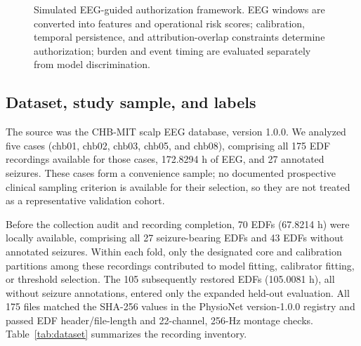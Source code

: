 \documentclass[11pt,a4paper]{article}
\begin{document}
\begin{figure}[H]
\centering
{}
\caption{Simulated EEG-guided authorization framework. EEG windows are converted into features and operational risk scores; calibration, temporal persistence, and attribution-overlap constraints determine authorization; burden and event timing are evaluated separately from model discrimination.}
\label{fig:pipeline}
\end{figure}
\FloatBarrier

\subsection{Dataset, study sample, and labels}
\label{sec:collection}
The source was the CHB-MIT scalp EEG database, version 1.0.0\citep{guttag2010chbmit}. We analyzed five cases (chb01, chb02, chb03, chb05, and chb08), comprising all 175 EDF recordings available for those cases, 172.8294 h of EEG, and 27 annotated seizures. These cases form a convenience sample; no documented prospective clinical sampling criterion is available for their selection, so they are not treated as a representative validation cohort.

Before the collection audit and recording completion, 70 EDFs (67.8214 h) were locally available, comprising all 27 seizure-bearing EDFs and 43 EDFs without annotated seizures. Within each fold, only the designated core and calibration partitions among these recordings contributed to model fitting, calibrator fitting, or threshold selection. The 105 subsequently restored EDFs (105.0081 h), all without seizure annotations, entered only the expanded held-out evaluation. All 175 files matched the SHA-256 values in the PhysioNet version-1.0.0 registry and passed EDF header/file-length and 22-channel, 256-Hz montage checks. Table~\ref{tab:dataset} summarizes the recording inventory.
\end{document}
